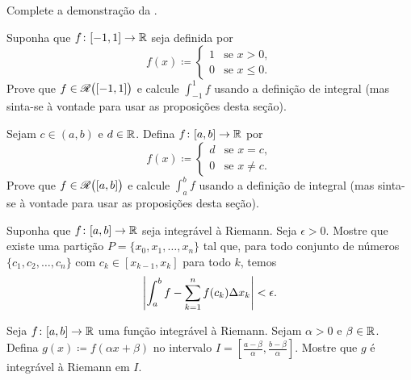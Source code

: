 \begin{exercise}
Complete a demonstração da .
\end{exercise}

\begin{exercise}
Suponha que $f \colon [-1,1] \to {\mathbb{R}}$ seja definida por
\begin{equation*}
f(x) \coloneqq
\begin{cases}
1 & \text{se } x > 0, \\
0 & \text{se } x \leq 0.
\end{cases}
\end{equation*}
Prove que $f \in {\mathscr{R}}\bigl([-1,1]\bigr)$ e
calcule $\int_{-1}^1 f$ usando a definição de integral
(mas sinta-se à vontade para usar as proposições desta seção).
\end{exercise}

\begin{exercise}
Sejam $c \in (a,b)$ e $d \in {\mathbb{R}}$.
Defina $f \colon [a,b] \to {\mathbb{R}}$ por
\begin{equation*}
f(x) \coloneqq
\begin{cases}
d & \text{se } x = c, \\
0 & \text{se } x \neq c.
\end{cases}
\end{equation*}
Prove que $f \in {\mathscr{R}}\bigl([a,b]\bigr)$ e
calcule
$\int_a^b f$ usando a definição de integral
(mas sinta-se à vontade para usar as proposições desta seção).
\end{exercise}

\begin{exercise} \label{exercise:taggedpartition}
Suponha que $f \colon [a,b] \to {\mathbb{R}}$ seja integrável à Riemann. Seja
$\epsilon > 0$. Mostre que existe uma partição $P = \{ x_0, x_1,
\ldots, x_n \}$
tal que, para todo
conjunto de números $\{ c_1, c_2, \ldots, c_n \}$ com
$c_k \in [x_{k-1},x_k]$ para todo $k$, temos
\begin{equation*}
\left\lvert {\int_a^b f - \sum_{k=1}^n f(c_k) \Delta x_k} \right\rvert < \epsilon .
\end{equation*}
\end{exercise}

\begin{exercise}
Seja $f \colon [a,b] \to {\mathbb{R}}$ uma função integrável à Riemann.
Sejam $\alpha > 0$ e $\beta \in {\mathbb{R}}$.
Defina $g(x) \coloneqq f(\alpha x + \beta)$ no intervalo
$I = [\frac{a-\beta}{\alpha}, \frac{b-\beta}{\alpha}]$. Mostre
que $g$ é integrável à Riemann em $I$.
\end{exercise}

